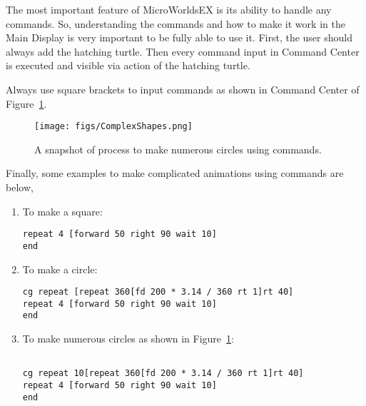 The most important feature of MicroWorldsEX is its ability to handle any commands. So, understanding the commands and how to make it work in the Main Display is very important to be fully able to use it. First, the user should always add the hatching turtle. Then every command input in Command Center is executed and visible via action of the hatching turtle. 

Always use square brackets to input commands as shown in Command Center of Figure~\ref{fig:ContinousCircle animation}.


\begin{figure}[h!]
\centering
\texttt{[image: figs/ComplexShapes.png]}
\caption{A snapshot of process to make numerous circles using commands.}
\label{fig:ContinousCircle animation}
\end{figure}

\newpage
Finally, some examples to make complicated animations using commands are below,
\begin{enumerate}
	\item To make a square:

\begin{lstlisting}
repeat 4 [forward 50 right 90 wait 10]
end
\end{lstlisting}

\item To make a circle:

\begin{lstlisting}
cg repeat [repeat 360[fd 200 * 3.14 / 360 rt 1]rt 40]
repeat 4 [forward 50 right 90 wait 10]
end
\end{lstlisting}

\item To make numerous circles as shown in Figure~\ref{fig:ContinousCircle animation}:

\begin{lstlisting}

cg repeat 10[repeat 360[fd 200 * 3.14 / 360 rt 1]rt 40]
repeat 4 [forward 50 right 90 wait 10]
end
\end{lstlisting}

\end{enumerate}
